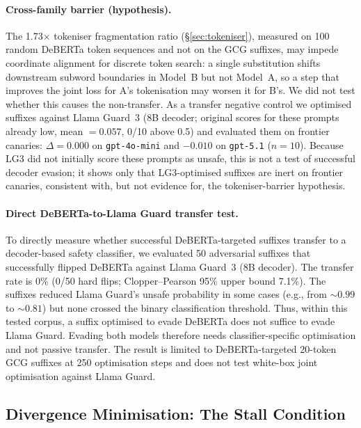 \documentclass{article}
\begin{document}
\paragraph{Cross-family barrier (hypothesis).} The 1.73$\times$ tokeniser fragmentation ratio (\S\ref{sec:tokeniser}), measured on 100 random DeBERTa token sequences and not on the GCG suffixes, may impede coordinate alignment for discrete token search: a single substitution shifts downstream subword boundaries in Model~B but not Model~A, so a step that improves the joint loss for A's tokenisation may worsen it for B's. We did not test whether this causes the non-transfer. As a transfer negative control we optimised suffixes against Llama Guard~3 (8B decoder; original scores for these prompts already low, mean $= 0.057$, 0/10 above 0.5) and evaluated them on frontier canaries: $\Delta = 0.000$ on \texttt{gpt-4o-mini} and $-0.010$ on \texttt{gpt-5.1} ($n = 10$). Because LG3 did not initially score these prompts as unsafe, this is not a test of successful decoder evasion; it shows only that LG3-optimised suffixes are inert on frontier canaries, consistent with, but not evidence for, the tokeniser-barrier hypothesis.

\paragraph{Direct DeBERTa-to-Llama Guard transfer test.} To directly measure whether successful DeBERTa-targeted suffixes transfer to a decoder-based safety classifier, we evaluated 50 adversarial suffixes that successfully flipped DeBERTa against Llama Guard~3 (8B decoder). The transfer rate is 0\% (0/50 hard flips; Clopper--Pearson 95\% upper bound 7.1\%). The suffixes reduced Llama Guard's unsafe probability in some cases (e.g., from ${\sim}0.99$ to ${\sim}0.81$) but none crossed the binary classification threshold. Thus, within this tested corpus, a suffix optimised to evade DeBERTa does not suffice to evade Llama Guard. Evading both models therefore needs classifier-specific optimisation and not passive transfer. The result is limited to DeBERTa-targeted 20-token GCG suffixes at 250 optimisation steps and does not test white-box joint optimisation against Llama Guard.

\subsection{Divergence Minimisation: The Stall Condition}
\label{sec:divergence-min}
\end{document}
